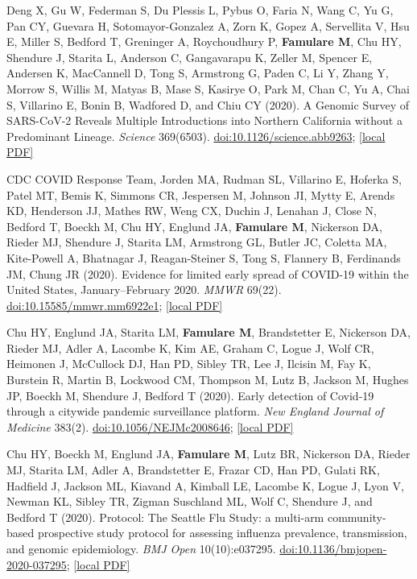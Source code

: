 \documentclass{article}
\begin{document}
\begin{llist}
\begin{items}
\item[{[16]}] Deng X, Gu W, Federman S, Du Plessis L, Pybus O, Faria N, Wang C, Yu G, Pan CY, Guevara H, Sotomayor-Gonzalez A, Zorn K, Gopez A, Servellita V, Hsu E, Miller S, Bedford T, Greninger A, Roychoudhury P, \textbf{Famulare M}, Chu HY, Shendure J, Starita L, Anderson C, Gangavarapu K, Zeller M, Spencer E, Andersen K, MacCannell D, Tong S, Armstrong G, Paden C, Li Y, Zhang Y, Morrow S, Willis M, Matyas B, Mase S, Kasirye O, Park M, Chan C, Yu A, Chai S, Villarino E, Bonin B, Wadfored D, and Chiu CY	(2020). A Genomic Survey of SARS-CoV-2 Reveals Multiple Introductions into Northern California without a Predominant Lineage. \emph{Science} 369(6503). \href{https://doi.org/10.1126/science.abb9263}{doi:10.1126/science.abb9263}; \href{https://famulare.github.io/assets/publication-mirror/journal-16.pdf}{[local PDF]}

\item[{[15]}] CDC COVID Response Team, Jorden MA, Rudman SL, Villarino E, Hoferka S, Patel MT, Bemis K, Simmons CR, Jespersen M, Johnson JI, Mytty E, Arends KD, Henderson JJ, Mathes RW, Weng CX, Duchin J, Lenahan J, Close N, Bedford T, Boeckh M, Chu HY, Englund JA, \textbf{Famulare M}, Nickerson DA, Rieder MJ, Shendure J, Starita LM, Armstrong GL, Butler JC, Coletta MA, Kite-Powell A, Bhatnagar J, Reagan-Steiner S, Tong S, Flannery B, Ferdinands JM, Chung JR (2020). Evidence for limited early spread of COVID-19 within the United States, January–February 2020. \emph{MMWR} 69(22). \href{https://doi.org/10.15585/mmwr.mm6922e1}{doi:10.15585/mmwr.mm6922e1}; \href{https://famulare.github.io/assets/publication-mirror/journal-15.pdf}{[local PDF]}

\item[{[14]}] Chu HY, Englund JA, Starita LM, \textbf{Famulare M}, Brandstetter E, Nickerson DA, Rieder MJ, Adler A, Lacombe K, Kim AE, Graham C, Logue J, Wolf CR, Heimonen J, McCullock DJ, Han PD, Sibley TR, Lee J, Ilcisin M, Fay K, Burstein R, Martin B, Lockwood CM, Thompson M, Lutz B, Jackson M, Hughes JP, Boeckh M, Shendure J, Bedford T (2020). Early detection of Covid-19 through a citywide pandemic surveillance platform. \emph{New England Journal of Medicine} 383(2). \href{https://doi.org/10.1056/NEJMc2008646}{doi:10.1056/NEJMc2008646}; \href{https://famulare.github.io/assets/publication-mirror/journal-14.pdf}{[local PDF]}

\item[{[13]}] Chu HY, Boeckh M, Englund JA, \textbf{Famulare M}, Lutz BR, Nickerson DA, Rieder MJ, Starita LM, Adler A, Brandstetter E, Frazar CD, Han PD, Gulati RK, Hadfield J, Jackson ML, Kiavand A, Kimball LE, Lacombe K, Logue J, Lyon V, Newman KL, Sibley TR, Zigman Suschland ML, Wolf C, Shendure J, and Bedford T (2020). Protocol: The Seattle Flu Study: a multi-arm community-based prospective study protocol for assessing influenza prevalence, transmission, and genomic epidemiology. \emph{BMJ Open} 10(10):e037295. \href{https://doi.org/10.1136/bmjopen-2020-037295}{doi:10.1136/bmjopen-2020-037295}; \href{https://famulare.github.io/assets/publication-mirror/journal-13.pdf}{[local PDF]}



\end{items}
\end{llist}
\end{document}
